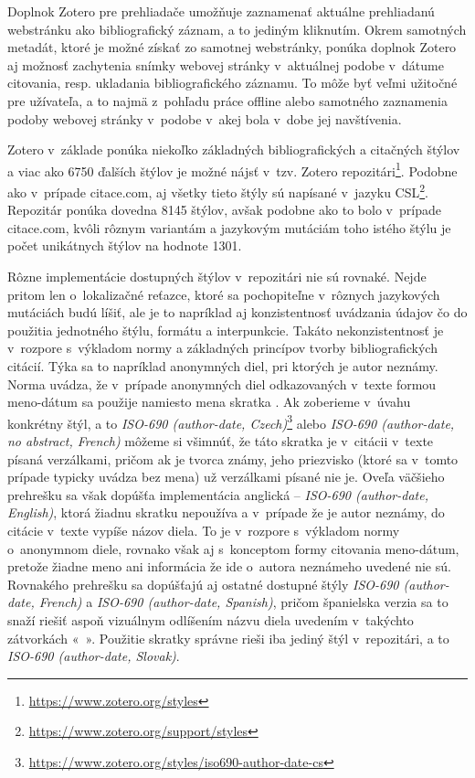 \documentclass{fithesis3}
\begin{document}
	Doplnok Zotero pre prehliadače umožňuje zaznamenať aktuálne prehliadanú webstránku ako bibliografický záznam, a to jediným kliknutím. Okrem samotných metadát, ktoré je možné získať zo samotnej webstránky, ponúka doplnok Zotero aj možnosť zachytenia snímky webovej stránky v~aktuálnej podobe v~dátume citovania, resp. ukladania bibliografického záznamu. To môže byť veľmi užitočné pre užívateľa, a to najmä z~pohľadu práce offline alebo samotného zaznamenia podoby webovej stránky v~podobe v~akej bola v~dobe jej navštívenia.
	
	Zotero v~základe ponúka niekoľko základných bibliografických a citačných štýlov a viac ako 6750 ďalších štýlov je možné nájsť v~tzv. Zotero repozitári\footnote{\url{https://www.zotero.org/styles}}. Podobne ako v~prípade citace.com, aj všetky tieto štýly sú napísané v~jazyku CSL\footnote{\url{https://www.zotero.org/support/styles}}. Repozitár ponúka dovedna 8145 štýlov, avšak podobne ako to bolo v~prípade citace.com, kvôli rôznym variantám a jazykovým mutáciám toho istého štýlu je počet unikátnych štýlov na hodnote 1301.
	
	Rôzne implementácie dostupných štýlov v~repozitári nie sú rovnaké. Nejde pritom len o~lokalizačné reťazce, ktoré sa pochopiteľne v~rôznych jazykových mutáciách budú líšiť, ale je to napríklad aj konzistentnosť uvádzania údajov čo do použitia jednotného štýlu, formátu a interpunkcie. Takáto nekonzistentnosť je v~rozpore s~výkladom normy a základných princípov tvorby bibliografických citácií. Týka sa to napríklad anonymných diel, pri ktorých je autor neznámy. Norma uvádza, že v~prípade anonymných diel odkazovaných v~texte formou meno-dátum sa použije namiesto mena skratka . Ak zoberieme v~úvahu konkrétny štýl, a to \textit{ISO-690 (author-date, Czech)}\footnote{\url{https://www.zotero.org/styles/iso690-author-date-cs}} alebo \textit{ISO-690 (author-date, no abstract, French)} môžeme si všimnúť, že táto skratka je v~citácii v~texte písaná verzálkami, pričom ak je tvorca známy, jeho priezvisko (ktoré sa v~tomto prípade typicky uvádza bez mena) už verzálkami písané nie je. Oveľa väčšieho prehrešku sa však dopúšťa implementácia anglická -- \textit{ISO-690 (author-date, English)}, ktorá žiadnu skratku  nepoužíva a v~prípade že je autor neznámy, do citácie v~texte vypíše názov diela. To je v~rozpore s~výkladom normy o~anonymnom diele, rovnako však aj s~konceptom formy citovania meno-dátum, pretože žiadne meno ani informácia že ide o~autora neznámeho uvedené nie sú. Rovnakého prehrešku sa dopúšťajú aj ostatné dostupné štýly \textit{ISO-690 (author-date, French)} a \textit{ISO-690 (author-date, Spanish)}, pričom španielska verzia sa to snaží riešiť aspoň vizuálnym odlíšením názvu diela uvedením v~takýchto zátvorkách «~». Použitie skratky  správne rieši iba jediný štýl v~repozitári, a to \textit{ISO-690 (author-date, Slovak)}.
	
\end{document}
